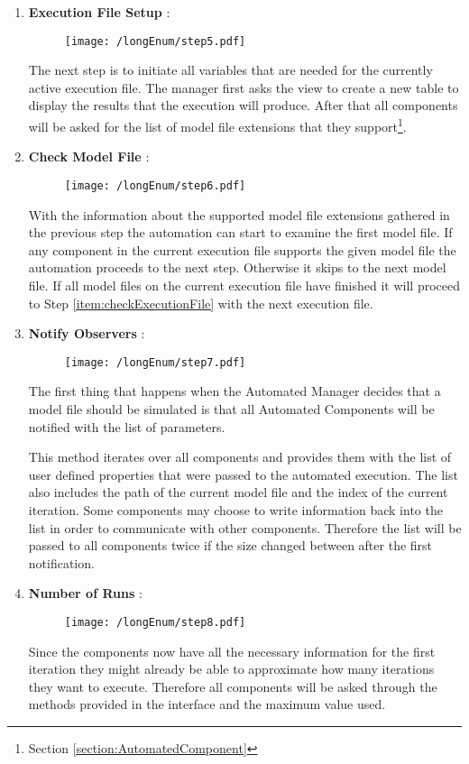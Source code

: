 \begin{enumerate}
 \item \label{item:setupExecutionFile} \textbf{Execution File Setup} :
\begin{figure}[H]
  \centering
  \texttt{[image: /longEnum/step5.pdf]}
\end{figure}
The next step is to initiate all variables that are needed
for the currently active execution file. The manager first asks the view to create a new table to
display the results that the execution will produce. After that all components will be asked
for the list of model file extensions that they support\footnote{Section \ref{section:AutomatedComponent}}.

 \item \label{item:checkModelFile} \textbf{Check Model File} :
\begin{figure}[H]
  \centering
  \texttt{[image: /longEnum/step6.pdf]}
\end{figure}
With the information about the supported model file extensions
gathered in the previous step the automation can start to examine the first model file. If any component
in the current execution file supports the given model file the automation proceeds to the next step.
Otherwise it skips to the next model file. If all model files on the current execution file
have finished it will proceed to Step \ref{item:checkExecutionFile} with the next execution file.

 \item \label{item:notifyObservers} \textbf{Notify Observers} :
\begin{figure}[H]
  \centering
  \texttt{[image: /longEnum/step7.pdf]}
\end{figure}
The first thing that happens when the Automated Manager decides
that a model file should be simulated is that all Automated Components will be notified with the
list of parameters. 

This method iterates over all components and provides them with the list
of user defined properties that were passed to the automated execution. The list also includes
the path of the current model file and the index of the current iteration. Some components
may choose to write information back into the list in order to communicate with other
components. Therefore the list will be passed to all components twice if the size changed
between after the first notification.

 \item \label{item:askForRuns} \textbf{Number of Runs} :
\begin{figure}[H]
  \centering
  \texttt{[image: /longEnum/step8.pdf]}
\end{figure}
Since the components now have all the necessary information for
the first iteration they might already be able to approximate how many iterations they want to
execute. Therefore all components will be asked through the methods provided in the interface
and the maximum value used.


\end{enumerate}

